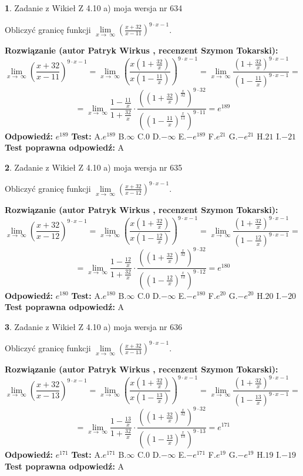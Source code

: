 \documentclass[12pt, a4paper]{article}
\theoremstyle{definition} %
\newtheorem{zad}{}
\newcommand{\zadStart}[1]{\begin{zad}#1\newline}
\newcommand{\zadStop}{\end{zad}}
\newcommand{\rozwStart}[2]{\noindent \textbf{Rozwiązanie (autor #1 , recenzent #2): }\newline}
\newcommand{\rozwStop}{\newline}
\newcommand{\odpStart}{\noindent \textbf{Odpowiedź:}\newline}
\newcommand{\odpStop}{\newline}
\newcommand{\testStart}{\noindent \textbf{Test:}\newline}
\newcommand{\testStop}{\newline}
\newcommand{\kluczStart}{\noindent \textbf{Test poprawna odpowiedź:}\newline}
\newcommand{\kluczStop}{\newline}
\begin{document}
\zadStart{Zadanie z Wikieł Z 4.10 a) moja wersja nr 634}

Obliczyć granicę funkcji  $\lim\limits_{x\to\ \infty}(\frac{x+32}{x-11})^{9\cdot x-1}$.
\zadStop
\rozwStart{Patryk Wirkus}{Szymon Tokarski}
$$\lim\limits_{x\to\ \infty}(\frac{x+32}{x-11})^{9\cdot x-1} = \lim\limits_{x\to\ \infty}(\frac{x(1+\frac{32}{x})}{x(1-\frac{11}{x})})^{9\cdot x-1}=\lim\limits_{x\to\ \infty}\frac{(1+\frac{32}{x})^{9\cdot x-1}}{(1-\frac{11}{x})^{9\cdot x-1}}=$$
$$=\lim\limits_{x\to\ \infty}\frac{1-\frac{11}{x}}{1+\frac{32}{x}}\cdot\frac{((1+\frac{32}{x})^{\frac{x}{32}})^{9\cdot32}}{((1-\frac{11}{x})^{\frac{x}{11}})^{9\cdot11}}=e^{189}$$
\rozwStop
\odpStart
$e^{189}$
\odpStop
\testStart
A.$e^{189}$ B.$\infty$ C.$0$ D.$-\infty$ E.$-e^{189}$
F.$e^{21}$ G.$-e^{21}$
H.$21$
I.$-21$
\testStop
\kluczStart
A
\kluczStop



\zadStart{Zadanie z Wikieł Z 4.10 a) moja wersja nr 635}

Obliczyć granicę funkcji  $\lim\limits_{x\to\ \infty}(\frac{x+32}{x-12})^{9\cdot x-1}$.
\zadStop
\rozwStart{Patryk Wirkus}{Szymon Tokarski}
$$\lim\limits_{x\to\ \infty}(\frac{x+32}{x-12})^{9\cdot x-1} = \lim\limits_{x\to\ \infty}(\frac{x(1+\frac{32}{x})}{x(1-\frac{12}{x})})^{9\cdot x-1}=\lim\limits_{x\to\ \infty}\frac{(1+\frac{32}{x})^{9\cdot x-1}}{(1-\frac{12}{x})^{9\cdot x-1}}=$$
$$=\lim\limits_{x\to\ \infty}\frac{1-\frac{12}{x}}{1+\frac{32}{x}}\cdot\frac{((1+\frac{32}{x})^{\frac{x}{32}})^{9\cdot32}}{((1-\frac{12}{x})^{\frac{x}{12}})^{9\cdot12}}=e^{180}$$
\rozwStop
\odpStart
$e^{180}$
\odpStop
\testStart
A.$e^{180}$ B.$\infty$ C.$0$ D.$-\infty$ E.$-e^{180}$
F.$e^{20}$ G.$-e^{20}$
H.$20$
I.$-20$
\testStop
\kluczStart
A
\kluczStop



\zadStart{Zadanie z Wikieł Z 4.10 a) moja wersja nr 636}

Obliczyć granicę funkcji  $\lim\limits_{x\to\ \infty}(\frac{x+32}{x-13})^{9\cdot x-1}$.
\zadStop
\rozwStart{Patryk Wirkus}{Szymon Tokarski}
$$\lim\limits_{x\to\ \infty}(\frac{x+32}{x-13})^{9\cdot x-1} = \lim\limits_{x\to\ \infty}(\frac{x(1+\frac{32}{x})}{x(1-\frac{13}{x})})^{9\cdot x-1}=\lim\limits_{x\to\ \infty}\frac{(1+\frac{32}{x})^{9\cdot x-1}}{(1-\frac{13}{x})^{9\cdot x-1}}=$$
$$=\lim\limits_{x\to\ \infty}\frac{1-\frac{13}{x}}{1+\frac{32}{x}}\cdot\frac{((1+\frac{32}{x})^{\frac{x}{32}})^{9\cdot32}}{((1-\frac{13}{x})^{\frac{x}{13}})^{9\cdot13}}=e^{171}$$
\rozwStop
\odpStart
$e^{171}$
\odpStop
\testStart
A.$e^{171}$ B.$\infty$ C.$0$ D.$-\infty$ E.$-e^{171}$
F.$e^{19}$ G.$-e^{19}$
H.$19$
I.$-19$
\testStop
\kluczStart
A
\kluczStop
\end{document}

